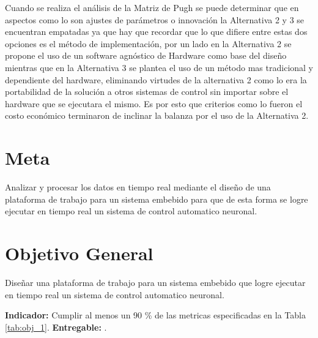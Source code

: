 \documentclass[12pt]{article}
\begin{document}
Cuando se realiza el análisis de la Matriz de Pugh se puede determinar que en aspectos como lo son ajustes de parámetros o innovación la Alternativa 2 y 3 se encuentran empatadas ya que hay que recordar que lo que difiere entre estas dos opciones es el método de implementación, por un lado en la Alternativa 2 se propone el uso de un software agnóstico de Hardware como base del diseño mientras que en la Alternativa 3 se plantea el uso de un método mas tradicional y dependiente del hardware, eliminando virtudes de la alternativa 2 como lo era la portabilidad de la solución a otros sistemas de control sin importar sobre el hardware que se ejecutara el mismo. Es por esto que criterios como lo fueron el costo económico terminaron de inclinar la balanza por el uso de la Alternativa 2. 

\section{Meta}

Analizar y procesar los datos en tiempo real mediante el diseño de una plataforma de trabajo para un sistema embebido para que de esta forma se logre ejecutar en tiempo real un sistema de control automatico neuronal.


\section{Objetivo General}

Diseñar una plataforma de trabajo para un sistema embebido que logre ejecutar en tiempo real un sistema de control automatico neuronal.

\textbf{Indicador:} Cumplir al menos un 90 \% de las metricas especificadas en la Tabla \ref{tab:obj_1}.\newline
\textbf{Entregable:} .
\end{document}

